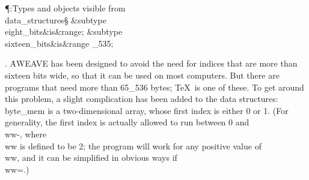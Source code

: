 \Y\P\?\4:Types and objects visible from \\{data\_structures}\X\mathrel{+}\S%
\?\6
\&{subtype}\8\\{eight\_bits}\8\&{is}\8\8\&{range}\?\to{};%
\6
\&{subtype}\8\\{sixteen\_bits}\8\&{is}\8\8\&{range}\?\to{}%
\_535;\par
\fi

. \.{AWEAVE} has been designed to avoid the need for indices that are more
than sixteen bits wide, so that it can be used on most computers. But
there are programs that need more than 65\_536 bytes; \TeX\ is one of these.
To get around this problem, a slight complication has been added to the
data structures:  \\{byte\_mem} is a two-dimensional array, whose first index
is either 0 or 1. (For generality, the first index is actually allowed to
run between 0 and \\{ww}\?-, where \\{ww} is defined to be 2; the program
will
work for any positive value of \\{ww}, and it can be simplified in obvious
ways if \\{ww}\?=.)

